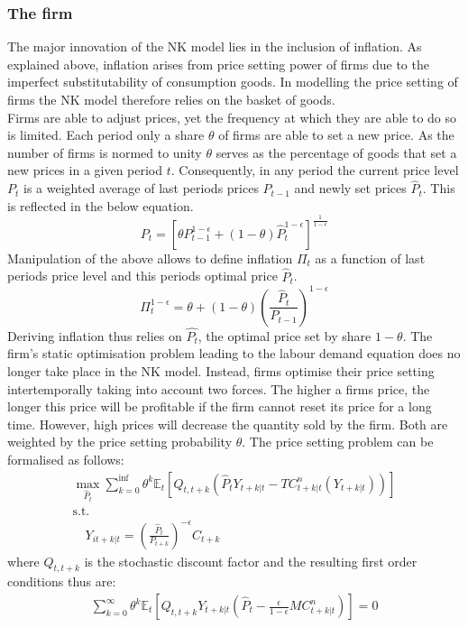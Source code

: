 \documentclass[12pt,a4paper,english]{article} %
\newcommand{\E}{\mathbb{E}} %
\begin{document}
	\subsubsection{The firm}
	The major innovation of the NK model lies in the inclusion of inflation. As explained above, inflation arises from price setting power of firms due to the imperfect substitutability of consumption goods. In modelling the price setting of firms the NK model therefore relies on the basket of goods. \\
	Firms are able to adjust prices, yet the frequency at which they are able to do so is limited. Each period only a share $\theta$ of firms are able to set a new price. As the number of firms is normed to unity $\theta$ serves as the percentage of goods that set a new prices in a given period $t$. Consequently, in any period the current price level $P_t$ is a weighted average of last periods prices $P_{t-1}$ and newly set prices $\hat{P}_t$. This is reflected in the below equation.
	\[
		P_t = \left[ 
					\theta P_{t-1}^{1 - \epsilon} + (1 - \theta) \hat{P}_t^{1 - \epsilon}
			\right]^{\frac{1}{1 - \epsilon}}
	\]
	Manipulation of the above allows to define inflation $\Pi_t$ as a function of last periods price level and this periods optimal price $\hat{P}_t$.
	\begin{equation} \label{eq: 2}
		\Pi_t^{1-\epsilon} = \theta + (1 - \theta) \left(\frac{\hat{P}_t}{P_{t-1}} \right)^{1-\epsilon}
	\end{equation}
	Deriving inflation thus relies on $\hat{P_t}$, the optimal price set by share $1-\theta$. The firm's static optimisation problem leading to the labour demand equation does no longer take place in the NK model. Instead, firms optimise their price setting intertemporally taking into account two forces. The higher a firms price, the longer this price will be profitable if the firm cannot reset its price for a long time. However, high prices will decrease the quantity sold by the firm. Both are weighted by the price setting probability $\theta$. The price setting problem can be formalised as follows: 
	\begin{equation}
		\begin{aligned}
			\max_{\hat{P}_t}
			\sum_{k=0}^{\inf} \theta^k \E_t 
			\left[
			Q_{t, t+k} 
			\left(
			\hat{P}_t Y_{t+k|t} - TC_{t+k|t}^n(Y_{t+k|t})
			\right)
			\right] \\
			\textrm{s.t.}\\
			\quad
			Y_{it+k|t} = \left(\frac{\hat{P}_t}{P_{t+k}} \right)^{-\epsilon} C_{t+k}
		\end{aligned}
	\end{equation}
	where $Q_{t, t+k}$ is the stochastic discount factor and the resulting first order conditions thus are:
	\begin{equation}
		\begin{aligned}
			\sum_{k=0}^{\infty} \theta^k \E_t 
			\left[
			Q_{t,t+k} Y_{t+k|t} 
			\left(
			\hat{P}_t - \frac{\epsilon}{1 - \epsilon} MC_{t+k|t}^n
			\right)
			\right]
			= 0
		\end{aligned}
	\end{equation}
	
\end{document}
